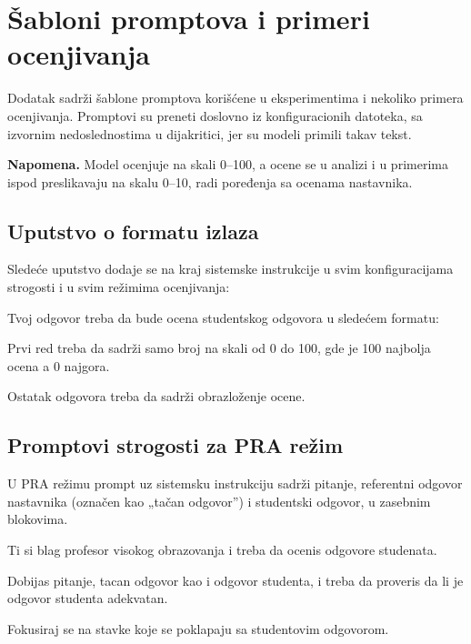 \chapter{Šabloni promptova i primeri ocenjivanja}
\label{app:promptovi}

Dodatak sadrži šablone promptova korišćene u eksperimentima i nekoliko primera ocenjivanja.
Promptovi su preneti doslovno iz konfiguracionih datoteka, sa izvornim nedoslednostima u dijakritici, jer su modeli primili takav tekst.

\medskip
\noindent\textbf{Napomena.} Model ocenjuje na skali 0--100,
a ocene se u analizi i u primerima ispod preslikavaju na skalu 0--10, radi poređenja sa ocenama nastavnika.

\section*{Uputstvo o formatu izlaza}

Sledeće uputstvo dodaje se na kraj sistemske instrukcije u svim konfiguracijama strogosti i u svim režimima ocenjivanja:

\begin{tcolorbox}[promptbox]

Tvoj odgovor treba da bude ocena studentskog odgovora u sledećem formatu:

Prvi red treba da sadrži samo broj na skali od 0 do 100, gde je 100 najbolja ocena a 0 najgora.

Ostatak odgovora treba da sadrži obrazloženje ocene.

\end{tcolorbox}

\section*{Promptovi strogosti za PRA režim}

U PRA režimu prompt uz sistemsku instrukciju sadrži pitanje, referentni odgovor nastavnika (označen kao „tačan odgovor'')
i studentski odgovor, u zasebnim blokovima.

\begin{tcolorbox}[promptbox, title={Blaga konfiguracija}]

Ti si blag profesor visokog obrazovanja i treba da ocenis odgovore studenata.

Dobijas pitanje, tacan odgovor kao i odgovor studenta, i treba da proveris da li je odgovor studenta adekvatan.

Fokusiraj se na stavke koje se poklapaju sa studentovim odgovorom.

\end{tcolorbox}

